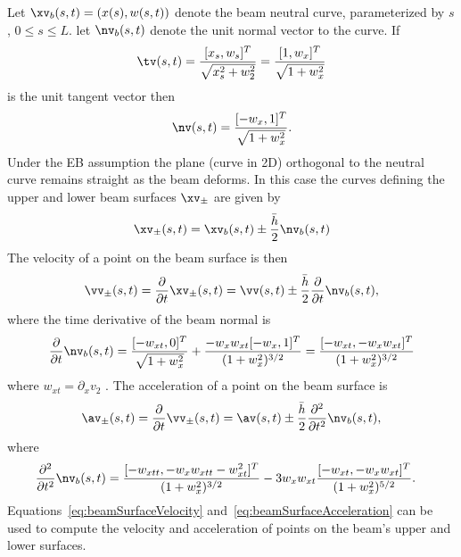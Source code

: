 \documentclass[11pt]{article}
\newcommand{\hs}{\bar{h}}
\newcommand{\xbv}{\xv_b}
\newcommand{\nsv}{\nv_b}
\begin{document}
Let $\xbv(s,t)=(x(s),w(s,t))$ denote the beam neutral curve, parameterized by $s$, $0\le s \le L$.
let $\nsv(s,t)$ denote the unit normal vector to the curve. If 
\begin{align*}
   \tv(s,t)= \frac{[ x_s,w_s]^T}{\sqrt{x_s^2+w_2^2}} = \frac{[ 1,w_x]^T}{\sqrt{1+w_x^2}}
\end{align*}
is the unit tangent vector then
\begin{align*}
   \nv(s,t)= \frac{[ -w_x, 1]^T}{\sqrt{1+w_x^2}}. 
\end{align*}
Under the EB assumption the plane (curve in 2D) orthogonal to the neutral curve remains straight as the beam deforms.
In this case the curves defining the upper and lower beam surfaces $\xv_\pm$ are given by
\begin{align*}
   \xv_\pm(s,t) = \xbv(s,t) \pm \frac{\hs}{2} \nsv(s,t)
\end{align*}
The velocity of a point on the beam surface is then 
\begin{align}
   \vv_\pm(s,t) = \frac{\partial}{\partial t}\xv_\pm(s,t) =  \vv(s,t) \pm \frac{\hs}{2} \frac{\partial}{\partial t}\nsv(s,t),
       \label{eq:beamSurfaceVelocity}
\end{align}
where the time derivative of the beam normal is 
\begin{align*}
   \frac{\partial}{\partial t}\nsv(s,t) = \frac{[ -w_{xt}, 0]^T}{\sqrt{1+w_x^2}} + 
                 \frac{-w_x w_{xt} [-w_x, 1]^T}{(1+w_x^2)^{3/2}} = \frac{[ -w_{xt}, -w_x w_{xt}]^T}{(1+w_x^2)^{3/2}}
\end{align*}
where $w_{xt}=\partial_x v_2$ .
The acceleration of a point on the beam surface is
\begin{align}
   \av_\pm(s,t) = \frac{\partial}{\partial t}\vv_\pm(s,t) =  \av(s,t) \pm \frac{\hs}{2} \frac{\partial^2}{\partial t^2}\nsv(s,t),
   \label{eq:beamSurfaceAcceleration}
\end{align}
where 
\begin{align*}
   \frac{\partial^2}{\partial t^2}\nsv(s,t) %
        & = \frac{[ -w_{xtt}, -w_x w_{xtt} -w_{xt}^2 ]^T}{(1+w_x^2)^{3/2}} 
           - 3 w_x w_{xt} \frac{[ -w_{xt}, -w_x w_{xt}]^T}{(1+w_x^2)^{5/2}} .
\end{align*}
Equations~\eqref{eq:beamSurfaceVelocity} and~\eqref{eq:beamSurfaceAcceleration} can be used to compute
the velocity and acceleration of points on the beam's upper and lower surfaces.
\end{document}
